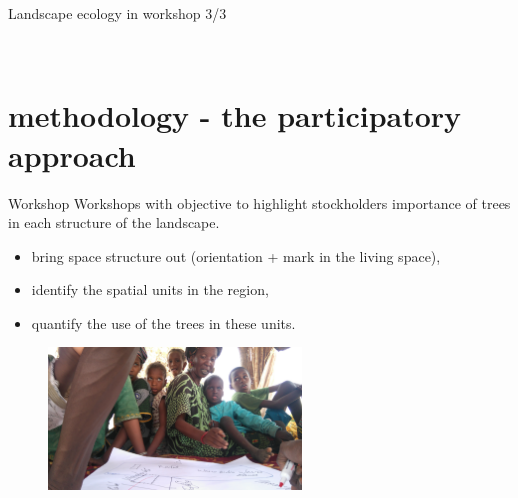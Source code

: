 \documentclass[newPxFont]{beamer}
\begin{document}
\begin{frame}[c]{Landscape ecology in workshop 3/3}
\vspace{-1cm}
\begin{figure}
  \\
\end{figure}
\end{frame}


\section{methodology - the participatory approach}
\begin{frame}[c]{Workshop}
\vspace{-1cm}
Workshops with objective to highlight stockholders importance of trees
in each structure of the landscape.

\begin{itemize}
  \item bring space structure out (orientation + mark in the living space),
  \item identify the spatial units in the region,
  \item quantify the use of the trees in these units.
\end{itemize}
\begin{figure}
	\centering
	\includegraphics[width = 0.6\textwidth,angle=180]{img/DSC_1789}
\end{figure}
\end{frame}
\end{document}
